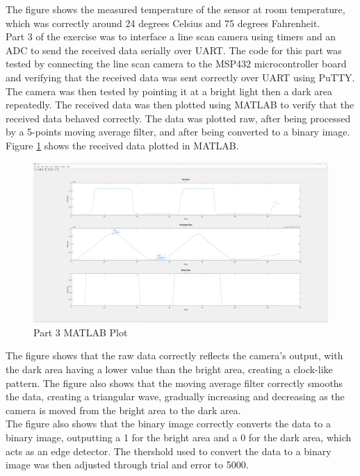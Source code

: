 \documentclass[CMPE]{KGCOEReport}
\begin{document}
The figure shows the measured temperature of the sensor at room temperature, which was correctly around 24 degrees Celsius and 75 degrees Fahrenheit.\\

Part 3 of the exercise was to interface a line scan camera using timers and an ADC to send the received data serially over UART. The code for this part was tested by connecting the line scan camera to the MSP432 microcontroller board and verifying that the received data was sent correctly over UART using PuTTY.\\

The camera was then tested by pointing it at a bright light then a dark area repeatedly. The received data was then plotted using MATLAB to verify that the received data behaved correctly. The data was plotted raw, after being processed by a 5-points moving average filter, and after being converted to a binary image. Figure \ref{fig:part3} shows the received data plotted in MATLAB.

\begin{figure}[H]
    \centering
    \includegraphics[width=1.00\textwidth]{part3.png}
    \caption{Part 3 MATLAB Plot}
    \label{fig:part3}
\end{figure}

The figure shows that the raw data correctly reflects the camera's output, with the dark area having a lower value than the bright area, creating a clock-like pattern. The figure also shows that the moving average filter correctly smooths the data, creating a triangular wave, gradually increasing and decreasing as the camera is moved from the bright area to the dark area.\\

The figure also shows that the binary image correctly converts the data to a binary image, outputting a 1 for the bright area and a 0 for the dark area, which acts as an edge detector. The thershold used to convert the data to a binary image was then adjusted through trial and error to 5000.\\
\end{document}
